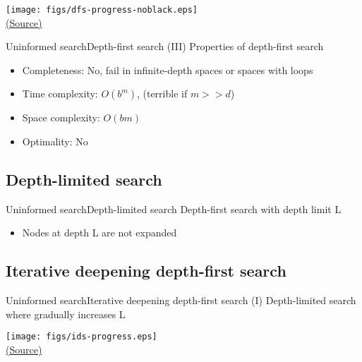 \documentclass[10pt,compress]{beamer} %
\begin{document}
\begin{frame}[plain]
      \begin{center}
          \texttt{[image: figs/dfs-progress-noblack.eps]}\\
          \tiny{\href{http://aima.cs.berkeley.edu/index.html}{(Source)}}
      \end{center}
\end{frame}

\begin{frame}{Uninformed search}{Depth-first search (III)}
      Properties of depth-first search
      \begin{itemize}
        \item Completeness: No, fail in infinite-depth spaces or spaces with loops
        \item Time complexity: $O(b^{m})$, (terrible if $m>>d$)
        \item Space complexity: $O(bm)$
        \item Optimality: No
      \end{itemize}
\end{frame}

\subsection{Depth-limited search}

\begin{frame}{Uninformed search}{Depth-limited search}
      Depth-first search with depth limit L
      \begin{itemize}
        \item Nodes at depth L are not expanded
      \end{itemize}
\end{frame}

\subsection{Iterative deepening depth-first search}

\begin{frame}{Uninformed search}{Iterative deepening depth-first search (I)}
    Depth-limited search where gradually increases L
\end{frame}

\begin{frame}
      \begin{center}
          \texttt{[image: figs/ids-progress.eps]}\\
          \tiny{\href{http://aima.cs.berkeley.edu/index.html}{(Source)}}
      \end{center}
\end{frame}
\end{document}
